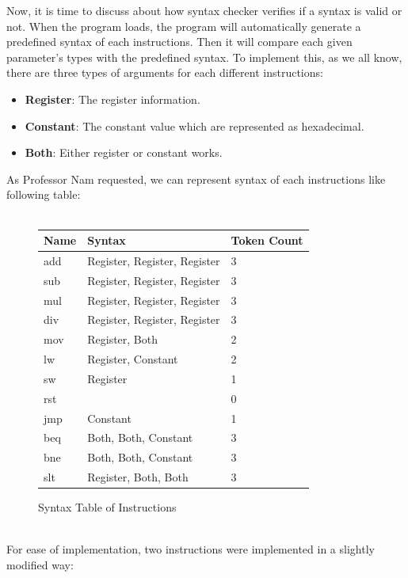 \documentclass{homework}
\begin{document}
Now, it is time to discuss about how syntax checker verifies if a syntax is valid or not. When the program loads, the program will automatically generate a predefined syntax of each instructions. Then it will compare each given parameter's types with the predefined syntax. To implement this, as we all know, there are three types of arguments for each different instructions:
\begin{itemize}
    \item \textbf{Register}: The register information.
    \item \textbf{Constant}: The constant value which are represented as hexadecimal.
    \item \textbf{Both}: Either register or constant works.
\end{itemize}

As Professor Nam requested, we can represent syntax of each instructions like following table:
\\
\\
\begin{figure}[h]
\begin{center}
\begin{tabular}{|l|l|l|}
    \hline
        \textbf{Name} & \textbf{Syntax} & \textbf{Token Count} \\
    \hline
        add & Register, Register, Register & 3 \\
        sub & Register, Register, Register & 3 \\
        mul & Register, Register, Register & 3 \\
        div & Register, Register, Register & 3 \\
        mov & Register, Both & 2 \\
        lw & Register, Constant & 2 \\
        sw & Register & 1 \\
        rst & & 0 \\
        jmp & Constant & 1 \\
        beq & Both, Both, Constant & 3 \\
        bne & Both, Both, Constant & 3 \\
        slt & Register, Both, Both & 3 \\
    \hline
\end{tabular}
\caption{Syntax Table of Instructions}
\end{center}
\end{figure}
\\
For ease of implementation, two instructions were implemented in a slightly modified way:
\end{document}
